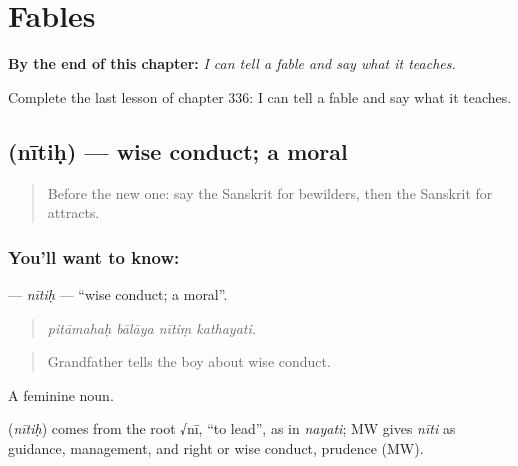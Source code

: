 
\chapter{Fables}
\label{ch:sa-fables}

\begin{chapteropening}
\textbf{By the end of this chapter:} \emph{I can tell a fable and say what it teaches.}

Complete the last lesson of chapter 336: I can tell a fable and say what it teaches.
\end{chapteropening}

\section[\texorpdfstring{\sk{नीतिः} (nītiḥ)}{नीतिः (nītiḥ)}]{ (nītiḥ) — wise conduct; a moral}

\label{lesson:SA-C336-nitih}



\begin{quote}
Before the new one: say the Sanskrit for bewilders, then the Sanskrit for attracts.
\end{quote}

\subsection*{You'll want to know: }
\textbf{} — \emph{nītiḥ} — \textquotedblleft{}wise conduct; a moral\textquotedblright{}.

\begin{quote}
   
\end{quote}

\begin{quote}
\emph{pitāmahaḥ bālāya nītiṃ kathayati.}
\end{quote}

\begin{quote}
Grandfather tells the boy about wise conduct.
\end{quote}

A feminine noun.

\begin{cousinweb}
\textbf{} (\emph{nītiḥ}) comes from the root √nī, \textquotedblleft{}to lead\textquotedblright{}, as in \emph{nayati}; MW gives \emph{nīti} as guidance, management, and right or wise conduct, prudence (MW).
\end{cousinweb}

